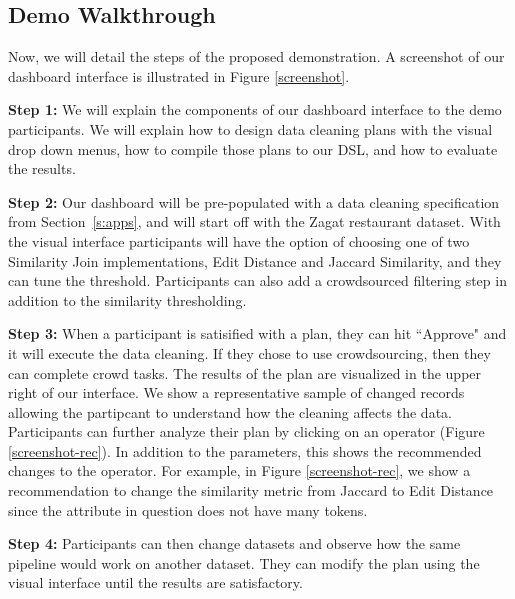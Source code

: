 \subsection{Demo Walkthrough}
Now, we will detail the steps of the proposed demonstration.
A screenshot of our dashboard interface is illustrated in Figure \ref{screenshot}.

\vspace{0.5em}

\noindent\textbf{Step 1: } We will explain the components of our dashboard interface to the
demo participants. We will explain how to design data cleaning plans with the visual 
drop down menus, how to compile those plans to our DSL, and how to evaluate the results.

\vspace{0.5em}

\noindent\textbf{Step 2: } Our dashboard will be pre-populated with a data cleaning specification from Section~\ref{s:apps}, and will
start off with the Zagat restaurant dataset. With the visual interface participants will have the option of choosing one of two Similarity Join implementations, Edit Distance and Jaccard Similarity, and they can tune the threshold.
Participants can also add a crowdsourced filtering step in addition to the similarity thresholding. 

\vspace{0.5em}

\noindent\textbf{Step 3: } When a participant is satisified with a plan, they can hit ``Approve" and it will execute the data cleaning. If they chose to use crowdsourcing, then they can complete crowd tasks. The results of the plan are visualized in the upper right of our interface.
We show a representative sample of changed records allowing the partipcant to understand how the cleaning affects the data. 
Participants can further analyze their plan by clicking on an operator (Figure \ref{screenshot-rec}).
In addition to the parameters, this shows the recommended changes to the operator.
For example, in Figure \ref{screenshot-rec}, we show a recommendation to change the similarity metric from Jaccard to Edit Distance since the attribute in question does not have many tokens.

\vspace{0.5em}

\noindent\textbf{Step 4: } Participants can then change datasets and observe how the same pipeline would work on another dataset.
They can modify the plan using the visual interface until the results are satisfactory.

